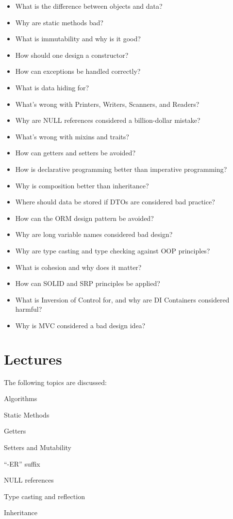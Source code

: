 \documentclass[nobrand,anonymous,nodate,nosecurity]{huawei}
\begin{document}
\begin{itemize}
\item What is the difference between objects and data?
\item Why are static methods bad?
\item What is immutability and why is it good?
\item How should one design a constructor?
\item How can exceptions be handled correctly?
\item What is data hiding for?
\item What's wrong with Printers, Writers, Scanners, and Readers?
\item Why are NULL references considered a billion-dollar mistake?
\item What's wrong with mixins and traits?
\item How can getters and setters be avoided?
\item How is declarative programming better than imperative programming?
\item Why is composition better than inheritance?
\item Where should data be stored if DTOs are considered bad practice?
\item How can the ORM design pattern be avoided?
\item Why are long variable names considered bad design?
\item Why are type casting and type checking against OOP principles?
\item What is cohesion and why does it matter?
\item How can SOLID and SRP principles be applied?
\item What is Inversion of Control for, and why are DI Containers considered harmful?
\item Why is MVC considered a bad design idea?
\end{itemize}

\newpage
\section*{Lectures}

The following topics are discussed:

\begin{lectures}
\item Algorithms
\item Static Methods
\item Getters
\item Setters and Mutability
\item ``-ER'' suffix
\item NULL references
\item Type casting and reflection
\item Inheritance
\end{lectures}
\end{document}
